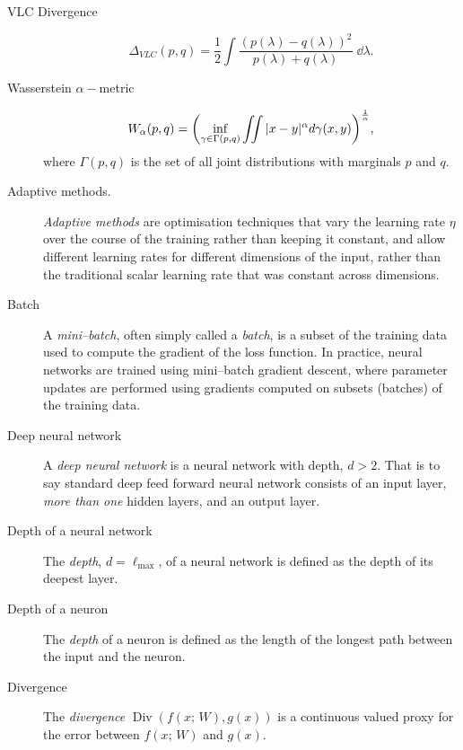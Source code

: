 \begin{description}
\item [VLC Divergence]
                \begin{equation}
                    \Delta_{VLC}(p, q) = \frac{1}{2}\int \frac{(p(\lambda) - q(\lambda))^2}{p(\lambda) + q(\lambda)} \;\dd\lambda.
                \end{equation}

\item [Wasserstein \(\alpha-\)metric]
            \begin{equation}
            W_\alpha(p, q) = \qty(\inf_{\gamma \in \Gamma(p, q)} \iint |x-y|^\alpha d\gamma(x, y))^{\frac1\alpha},
        \end{equation}
        where \(\Gamma(p, q)\) is the set of all joint distributions with marginals \(p\) and \(q\).

\item [Adaptive methods.]
                \emph{Adaptive methods} are optimisation techniques that vary the learning rate \(\eta\) over the course of the training rather than keeping it constant, and allow different learning rates for different dimensions of the input, rather than the traditional scalar learning rate that was constant across dimensions.

\item [Batch]
                A \emph{mini--batch}, often simply called a \emph{batch}, is a subset of the training data used to compute the gradient of the loss function.
                In practice, neural networks are trained using mini--batch gradient descent, where parameter updates are performed using gradients computed on subsets (batches) of the training data.

\item [Deep neural network]
            A \emph{deep neural network} is a neural network with depth, \(d > 2\).
            That is to say standard deep feed forward neural network consists of an input layer, \emph{more than one} hidden layers, and an output layer.%

\item [Depth of a neural network]
            The \emph{depth}, \(d = \ell_{\max}\), of a neural network is defined as the depth of its deepest layer.

\item [Depth of a neuron]
            The \emph{depth} of a neuron is defined as the length of the longest path between the input and the neuron.

\item [Divergence]
                The \emph{divergence} \(\operatorname{Div}(f(x;\,W), g(x))\) is a continuous valued proxy for the error between \(f(x;\,W)\) and \(g(x)\).


\end{description}
